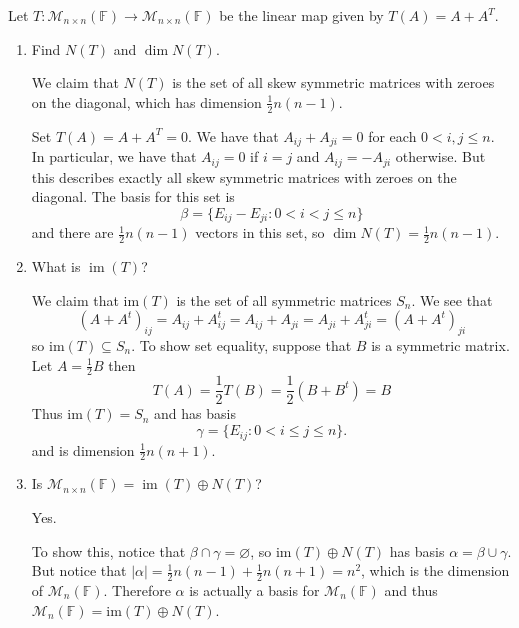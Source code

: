 \documentclass{eh-homework}
\begin{document}
    \begin{question}{5}
        Let \( T : \mathcal{M}_{n \times n}(\mathbb{F}) \to \mathcal{M}_{n \times n}(\mathbb{F}) \) be the linear map given by \( T(A) = A + A^T \).

        \begin{enumerate}[label=(\alph*)]
            \item Find \( N(T) \) and \( \dim N(T) \).
            
            We claim that \(N(T)\) is the set of all skew symmetric matrices with zeroes on the diagonal, which has dimension \(\frac{1}{2}n(n-1)\).
            
            Set \(T(A) = A + A^T = 0\). We have that \(A_{ij} + A_{ji} = 0\) for each \(0 < i,j \leq n\). In particular, we have that \(A_{ij} = 0\) if \(i = j\) and \(A_{ij} = -A_{ji}\) otherwise. But this describes exactly all skew symmetric matrices with zeroes on the diagonal. The basis for this set is
            \[
                \beta = \{ E_{ij} - E_{ji} : 0 < i < j \leq n \}
            \]
            and there are \(\frac{1}{2}n(n-1)\) vectors in this set, so \(\dim N(T) = \frac{1}{2}n(n-1)\).
            \item What is \( \operatorname{im}(T) \)?
            
            We claim that \(\mathrm{im} (T)\) is the set of all symmetric matrices \(S_n\). We see that
            \[
                (A + A^t)_{ij} = A_{ij} + A^t_{ij} = A_{ij} + A_{ji} = A_{ji} + A^t_{ji} = (A + A^t)_{ji}
            \]
            so \(\mathrm{im} (T) \subseteq S_n\). To show set equality, suppose that \(B\) is a symmetric matrix. Let \(A = \frac{1}{2}B\) then
            \[
                T(A) = \frac{1}{2}T(B) = \frac{1}{2}(B + B^t) = B
            \]
            Thus \(\mathrm{im} (T) = S_n\) and has basis
            \[
                \gamma = \{ E_{ij} : 0 < i \leq j \leq n \}.
            \]
            and is dimension \(\frac{1}{2}n(n+1)\).
            \item Is \( \mathcal{M}_{n \times n}(\mathbb{F}) = \operatorname{im}(T) \oplus N(T) \)?
            
            Yes.

            To show this, notice that \(\beta \cap \gamma = \varnothing\), so \(\mathrm{im} (T) \oplus N(T)\) has basis \(\alpha = \beta \cup \gamma\). But notice that \(|\alpha| = \frac{1}{2}n(n-1) + \frac{1}{2}n(n+1) = n^2\), which is the dimension of \(\mathcal{M} _n(\mathbb{F})\). Therefore \(\alpha\) is actually a basis for \(\mathcal{M} _n(\mathbb{F})\) and thus \(\mathcal{M} _n(\mathbb{F}) = \mathrm{im} (T) \oplus N(T)\).
        \end{enumerate}
    \end{question}
\end{document}
